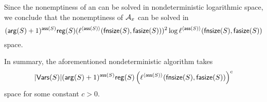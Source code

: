 Since the nonemptiness of an \FA{} can be solved in nondeterministic logarithmic space, we conclude that the nonemptiness of $\mathcal{A}_x$ can be solved in 
{\small
$$(\mathsf{arg}(S)+1)^{\mathsf{ass}(S)} \mathsf{reg}(S) (\ell^{\langle \mathsf{ass}(S) \rangle}(\mathsf{fnsize}(S), \mathsf{fasize}(S)))^2 \log \ell^{\langle \mathsf{ass}(S) \rangle}(\mathsf{fnsize}(S), \mathsf{fasize}(S))$$
}
space.

In summary, the aforementioned nondeterministic algorithm takes 
$$|\mathsf{Vars}(S)|(\mathsf{arg}(S)+1)^{\mathsf{ass}(S)}  \mathsf{reg}(S) \left(\ell^{\langle \mathsf{ass}(S) \rangle}(\mathsf{fnsize}(S), \mathsf{fasize}(S)) \right)^c$$
 space for some constant $c > 0$.